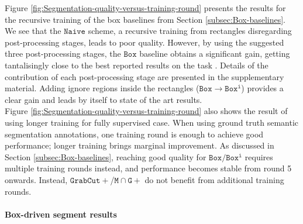 \documentclass[10pt,english,british,twocolumn]{article}
\begin{document}
Figure \ref{fig:Segmentation-quality-versus-training-round} presents
the results for the recursive training of the box baselines from Section
\ref{subsec:Box-baselines}. We see that the $\mathtt{Naive}$ scheme,
a recursive training from rectangles disregarding post-processing
stages, leads to poor quality. However, by using the suggested three
post-processing stages, the $\mathtt{Box}$ baseline obtains a significant
gain, getting tantalisingly close to the best reported results on
the task \cite{Dai2015Iccv}. Details of the contribution of each
post-processing stage are presented in the supplementary material.
Adding ignore regions inside the rectangles ($\mathtt{Box}\rightarrow\mathtt{Box^{i}}$)
provides a clear gain and leads by itself to state of the art results.\\
Figure \ref{fig:Segmentation-quality-versus-training-round} also
shows the result of using longer training for fully supervised case.
When using ground truth semantic segmentation annotations, one training
round is enough to achieve good performance; longer training brings
marginal improvement. As discussed in Section \ref{subsec:Box-baselines},
reaching good quality for $\mathtt{Box}/\mathtt{Box^{i}}$ requires
multiple training rounds instead, and performance becomes stable from
round 5 onwards. Instead, $\mathtt{GrabCut+}$/$\mathtt{M}\cap\mathtt{G+}$
do not benefit from additional training rounds.

\paragraph{Box-driven segment results}
\end{document}
